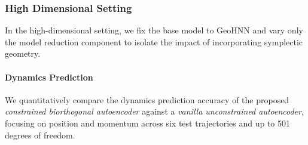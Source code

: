 \documentclass{article}
\theoremstyle{plain}
\theoremstyle{definition}
\theoremstyle{remark}
\begin{document}
\subsubsection{High Dimensional Setting}
In the high-dimensional setting, we fix the base model to GeoHNN and vary only the model reduction component to isolate the impact of incorporating symplectic geometry. 

\paragraph{Dynamics Prediction}
We quantitatively compare the dynamics prediction accuracy of the proposed \emph{constrained biorthogonal autoencoder} against a \emph{vanilla unconstrained autoencoder}, focusing on position and momentum across six test trajectories and up to 501 degrees of freedom.
\end{document}
